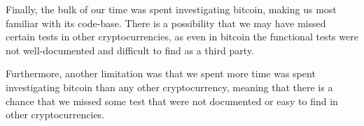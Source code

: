Finally, the bulk of our time was spent investigating bitcoin, making us most
familiar with its code-base. There is a possibility that we may have missed
certain tests in other cryptocurrencies, as even in bitcoin the functional tests
were not well-documented and difficult to find as a third party.

Furthermore, another limitation was that we spent more time was spent investigating bitcoin than any other cryptocurrency, meaning that there is a chance that we missed
some test that were not documented or easy to find in other cryptocurrencies.
\fi
